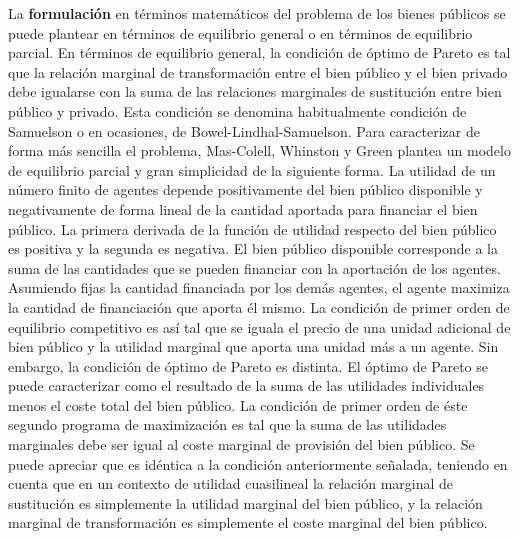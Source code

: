 \documentclass{nuevotema}
\begin{document}
La \textbf{formulación} en términos matemáticos del problema de los bienes públicos se puede plantear en términos de equilibrio general o en términos de equilibrio parcial. En términos de equilibrio general, la condición de óptimo de Pareto es tal que la relación marginal de transformación entre el bien público y el bien privado debe igualarse con la suma de las relaciones marginales de sustitución entre bien público y privado. Esta condición se denomina habitualmente condición de Samuelson o en ocasiones, de Bowel-Lindhal-Samuelson. Para caracterizar de forma más sencilla el problema, Mas-Colell, Whinston y Green plantea un modelo de equilibrio parcial y gran simplicidad de la siguiente forma. La utilidad de un número finito de agentes depende positivamente del bien público disponible y negativamente de forma lineal de la cantidad aportada para financiar el bien público. La primera derivada de la función de utilidad respecto del bien público es positiva y la segunda es negativa. El bien público disponible corresponde a la suma de las cantidades que se pueden financiar con la aportación de los agentes. Asumiendo fijas la cantidad financiada por los demás agentes, el agente maximiza la cantidad de financiación que aporta él mismo. La condición de primer orden de equilibrio competitivo es así tal que se iguala el precio de una unidad adicional de bien público y la utilidad marginal que aporta una unidad más a un agente. Sin embargo, la condición de óptimo de Pareto es distinta. El óptimo de Pareto se puede caracterizar como el resultado de la suma de las utilidades individuales menos el coste total del bien público. La condición de primer orden de éste segundo programa de maximización es tal que la suma de las utilidades marginales debe ser igual al coste marginal de provisión del bien público. Se puede apreciar que es idéntica a la condición anteriormente señalada, teniendo en cuenta que en un contexto de utilidad cuasilineal la relación marginal de sustitución es simplemente la utilidad marginal del bien público, y la relación marginal de transformación es simplemente el coste marginal del bien público. 
\end{document}
